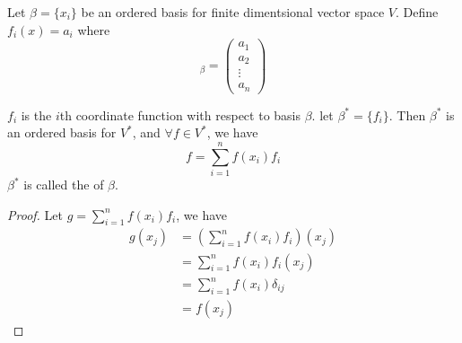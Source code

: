 \begin{definition}
	Let $\beta = \{ x_i\}$ be an ordered basis for finite dimentsional vector space $V$. Define $f_i (x) = a_i$ where
	\begin{equation*}
	    [x]_\beta = \begin{pmatrix}
	        a_1 \\
	        a_2 \\
	        \vdots \\
	        a_n
	    \end{pmatrix}
	\end{equation*}
	
	$f_i$ is the $i$th coordinate function with respect to basis $\beta$. let $\beta^*=\{f_i\}$. Then $\beta^*$ is an ordered basis for $V^*$, and $\forall f \in V^*$, we have
	\begin{equation}
		f = \sum_{i=1}^n f(x_i) f_i
	\end{equation}
	$\beta^*$ is called the  of $\beta$.
\end{definition}
\begin{proof}
	Let $g =\displaystyle \sum_{i=1}^n f(x_i) f_i$, we have
	\begin{equation*}
		\begin{aligned}
			g(x_j) &= \left( \sum_{i=1}^n f(x_i) f_i \right) (x_j) \\
			&= \sum_{i=1}^n f(x_i) f_i (x_j) \\
			&= \sum_{i=1}^n f(x_i) \delta_{ij} \\
			&= f(x_j)
		\end{aligned}
	\end{equation*}
\end{proof}


